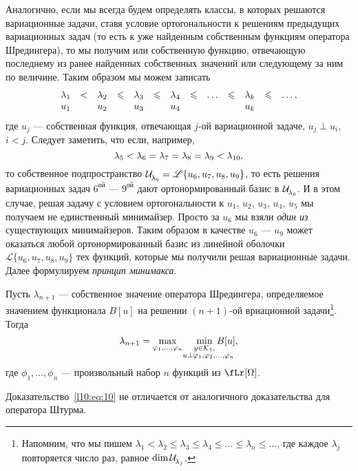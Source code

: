 Аналогично, если мы всегда будем определять классы, в которых решаются вариационные задачи, ставя условие ортогональности к решениям предыдущих вариационных задач (то есть к уже найденным собственным функциям оператора Шредингера), то мы получим или собственную функцию, отвечающую последнему из ранее найденных собственных значений или следующему за ним по величине. Таким образом мы можем записать
\begin{equation}\label{l10:eq:9}
	\hfill\begin{array}{ccccccccccccc}
		\lambda_1&<&\lambda_2&\leqslant&\lambda_3&\leqslant&\lambda_4&\leqslant&\ldots&\leqslant&\lambda_k&\leqslant&\ldots,\\
		u_1& &u_2& &u_3& &u_4& & & &u_k& &\\
	\end{array}\hfill
\end{equation} 
где $u_j$ --- собственная функция, отвечающая $j$-ой вариационной задаче, $u_j\perp u_i$, $i<j$. Следует заметить, что если, например, 
\begin{equation*}
	\hfill\lambda_5<\lambda_6=\lambda_7=\lambda_8=\lambda_9<\lambda_{10},\hfill
\end{equation*}
то собственное подпространство $\Ul[\lambda_6]=\mathscr{L}\{u_6,u_7,u_8,u_9\}$, то есть решения вариационных задач $6^{\text{ой}}$ --- $9^{\text{ой}}$ дают ортонормированный базис в $\Ul[\lambda_6]$. И в этом случае, решая задачу с условием ортогональности к $u_1$, $u_2$, $u_3$, $u_4$, $u_5$ мы получаем не единственный минимайзер. Просто за $u_6$ мы взяли \emph{один из} существующих минимайзеров. Таким образом в качестве $u_6$ --- $u_9$ может оказаться любой ортонормированный базис из линейной оболочки $\mathscr{L}\{u_6,u_7,u_8,u_9\}$ тех функций, которые мы получили решая вариационные задачи. Далее формулируем \emph{принцип минимакса}.
\begin{_teor}
	Пусть $\lambda_{n+1}$ --- собственное значение оператора Шредингера, определяемое значением функционала $B[u]$ на решении $(n+1)$-ой вриационной задачи\footnote{\label{l10:fn:1}Напомним, что мы пишем $\lambda_1<\lambda_2\leqslant\lambda_3\leqslant\lambda_4\leqslant\ldots\leqslant\lambda_n\leqslant\ldots$, где каждое $\lambda_j$ повторяется число раз, равное $\dim\Ul[\lambda_j]$.}. Тогда
	\begin{equation}\label{l10:eq:10}
		\hfill\lambda_{n+1}=\max\limits_{\phi_1,\ldots,\phi_{n}}\quad\min\limits_{\substack{y\in\K_1,\\\lefteqn{\scriptstyle \hspace*{-0.8cm}u\perp\phi_1,\phi_2,\ldots,\phi_{n}}}}B[u],\hfill
	\end{equation}
	где $\phi_1,\ldots,\phi_n$ --- произвольный набор $n$ функций из $\fLr[\Omega]$.
\end{_teor}
\noindent Доказательство~\eqref{l10:eq:10} не отличается от аналогичного доказательства для оператора Штурма.

